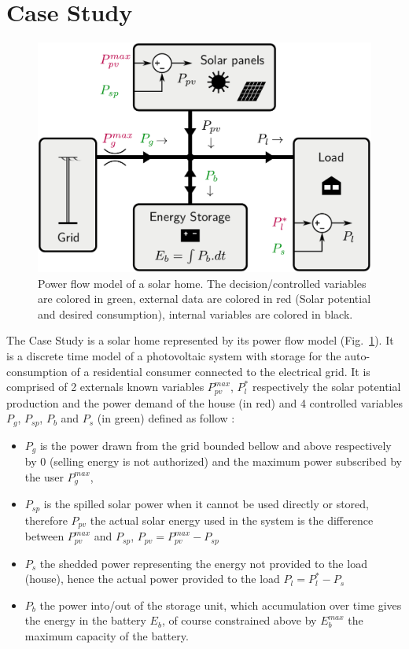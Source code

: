 \documentclass{ifacconf}
\begin{document}
\section{Case Study}\label{CaseStudy}
\begin{figure}[!ht]
        \begin{center}
                \includegraphics[width=0.9\columnwidth]{Figures/solar_home_compact.pdf}
        \end{center}

        \caption{Power flow model of a solar home.
        The decision/controlled variables are colored in green, external data are colored in red (Solar potential and desired consumption), internal variables are colored in black.
        }
        \label{fig:solhome}
\end{figure}
\quad The Case Study is a solar home represented by its power flow model (Fig.~\ref{fig:solhome}). It is a discrete time model of a photovoltaic system with storage for the auto-consumption of a residential consumer connected to the electrical grid. It is comprised of 2 externals known variables $P_{pv}^{max}$, $P_l^*$ respectively the solar potential production  and the power demand of the house (in red) and 4 controlled variables $P_g$, $P_{sp}$, $P_b$ and $P_s$ (in green) defined as follow : 
\begin{itemize}
\item $P_g$ is the power drawn from the grid bounded bellow and above
respectively by 0 (selling energy is not authorized) and the maximum power subscribed by the user $P_g^{max}$,
\item $P_{sp}$ is the spilled solar power when it cannot be used directly or stored, therefore $P_{pv}$ the actual solar energy used in the system is the difference between $P_{pv}^{max}$ and $P_{sp}$, $P_{pv} = P_{pv}^{max}-P_{sp}$
\item $P_s$ the shedded power representing the energy not provided to the load (house), hence the actual power provided to the load $P_l = P_l^* - P_s$
\item $P_b$ the power into/out of the storage unit, which accumulation over time gives the energy in the battery $E_b$, of course constrained above by $E_b^{max}$ the maximum capacity of the battery. 
\end{itemize}
\end{document}
